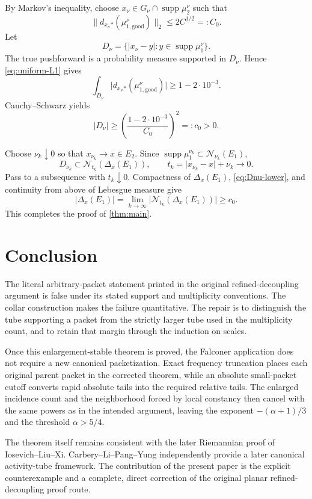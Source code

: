 \documentclass[11pt,letterpaper]{amsart}
\newcommand{\supp}{\operatorname{supp}}
\newcommand{\cN}{\mathcal{N}}
\newcommand{\abs}[1]{\lvert#1\rvert}
\newcommand{\norm}[1]{\lVert#1\rVert}
\begin{document}
By Markov's inequality, choose
$x_\nu\in G_\nu\cap\supp\mu_2^\nu$ such that
\[
 \norm{d_{x_\nu}{}_*(\mu_{1,\mathrm{good}}^\nu)}_2\le2C^{1/2}=:C_0.
\]
Let
\[
 D_\nu=\{\abs{x_\nu-y}:y\in\supp\mu_1^\nu\}.
\]
The true pushforward is a probability measure supported in $D_\nu$. Hence \eqref{eq:uniform-L1} gives
\[
 \int_{D_\nu}\abs{d_{x_\nu}{}_*(\mu_{1,\mathrm{good}}^\nu)}
 \ge1-2\cdot10^{-3}.
\]
Cauchy--Schwarz yields
\begin{equation}\label{eq:Dnu-lower}
 \abs{D_\nu}\ge
 \left(\frac{1-2\cdot10^{-3}}{C_0}\right)^2=:c_0>0.
\end{equation}

Choose $\nu_k\downarrow0$ so that $x_{\nu_k}\to x\in E_2$. Since
$\supp\mu_1^{\nu_k}\subset\cN_{\nu_k}(E_1)$,
\[
 D_{\nu_k}\subset
 \cN_{t_k}(\Delta_x(E_1)),
 \qquad t_k=\abs{x_{\nu_k}-x}+\nu_k\to0.
\]
Pass to a subsequence with $t_k\downarrow0$. Compactness of $\Delta_x(E_1)$, \eqref{eq:Dnu-lower}, and continuity from above of Lebesgue measure give
\[
 \abs{\Delta_x(E_1)}
 =\lim_{k\to\infty}\abs{\cN_{t_k}(\Delta_x(E_1))}
 \ge c_0.
\]
This completes the proof of \cref{thm:main}.


\section{Conclusion}

The literal arbitrary-packet statement printed in the original
refined-decoupling argument is false under its stated support and
multiplicity conventions.  The collar construction makes the failure
quantitative.  The repair is to distinguish the tube supporting a packet
from the strictly larger tube used in the multiplicity count, and to retain
that margin through the induction on scales.

Once this enlargement-stable theorem is proved, the Falconer application
does not require a new canonical packetization.  Exact frequency truncation
places each original parent packet in the corrected theorem, while an
absolute small-packet cutoff converts rapid absolute tails into the required
relative tails.  The enlarged incidence count and the neighborhood forced
by local constancy then cancel with the same powers as in the intended
argument, leaving the exponent \(-(\alpha+1)/3\) and the threshold
\(\alpha>5/4\).

The theorem itself remains consistent with the later Riemannian proof of
Iosevich--Liu--Xi.  Carbery--Li--Pang--Yung independently provide a later
canonical activity-tube framework.  The contribution of the present paper
is the explicit counterexample and a complete, direct correction of the
original planar refined-decoupling proof route.
\end{document}
